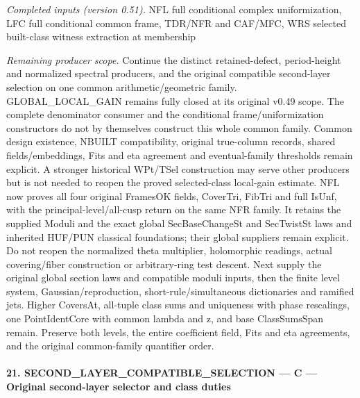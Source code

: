 \emph{Completed inputs (version 0.51).} NFL full conditional complex uniformization, LFC full conditional common frame, TDR/NFR and CAF/MFC, WRS selected built-class witness extraction at membership

\emph{Remaining producer scope.} Continue the distinct retained-defect, period-height and normalized spectral producers, and the original compatible second-layer selection on one common arithmetic/geometric family. GLOBAL\_\allowbreak LOCAL\_\allowbreak GAIN remains fully closed at its original v0.49 scope. The complete denominator consumer and the conditional frame/uniformization constructors do not by themselves construct this whole common family. Common design existence, NBUILT compatibility, original true-column records, shared fields/embeddings, Fits and eta agreement and eventual-family thresholds remain explicit. A stronger historical WPt/TSel construction may serve other producers but is not needed to reopen the proved selected-class local-gain estimate. NFL now proves all four original FramesOK fields, CoverTri, FibTri and full IsUnf, with the principal-level/all-cusp return on the same NFR family. It retains the supplied Moduli and the exact global SecBaseChangeSt and SecTwistSt laws and inherited HUF/PUN classical foundations; their global suppliers remain explicit. Do not reopen the normalized theta multiplier, holomorphic readings, actual covering/fiber construction or arbitrary-ring test descent. Next supply the original global section laws and compatible moduli inputs, then the finite level system, Gaussian/reproduction, short-rule/simultaneous dictionaries and ramified jets. Higher CoversAt, all-tuple class sums and uniqueness with phase rescalings, one PointIdentCore with common lambda and z, and base ClassSumsSpan remain. Preserve both levels, the entire coefficient field, Fits and eta agreements, and the original common-family quantifier order.



\paragraph{21. SECOND\_\allowbreak LAYER\_\allowbreak COMPATIBLE\_\allowbreak SELECTION — C — Original second-layer selector and class duties}

